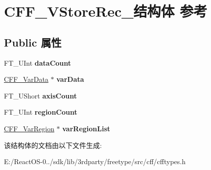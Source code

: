 \hypertarget{struct_c_f_f___v_store_rec__}{}\section{C\+F\+F\+\_\+\+V\+Store\+Rec\+\_\+结构体 参考}
\label{struct_c_f_f___v_store_rec__}
\subsection*{Public 属性}
\begin{DoxyCompactItemize}
\item 
\mbox{\label{struct_c_f_f___v_store_rec___a2d09d3df3ea4d96975e38cfc870225cf}} 
F\+T\+\_\+\+U\+Int {\bfseries data\+Count}
\item 
\mbox{\label{struct_c_f_f___v_store_rec___a93a7c518b67102698070460fa7b7b9ea}} 
\hyperlink{struct_c_f_f___var_data__}{C\+F\+F\+\_\+\+Var\+Data} $\ast$ {\bfseries var\+Data}
\item 
\mbox{\label{struct_c_f_f___v_store_rec___aafe9628f5bb2a5b56a456ef50625d54b}} 
F\+T\+\_\+\+U\+Short {\bfseries axis\+Count}
\item 
\mbox{\label{struct_c_f_f___v_store_rec___ad71acf62364b7b68725e842e4a8c54a4}} 
F\+T\+\_\+\+U\+Int {\bfseries region\+Count}
\item 
\mbox{\label{struct_c_f_f___v_store_rec___a555f377917d6269ef73d878f1d5176dc}} 
\hyperlink{struct_c_f_f___var_region__}{C\+F\+F\+\_\+\+Var\+Region} $\ast$ {\bfseries var\+Region\+List}
\end{DoxyCompactItemize}


该结构体的文档由以下文件生成\+:\begin{DoxyCompactItemize}
\item 
E\+:/\+React\+O\+S-\/0../sdk/lib/3rdparty/freetype/src/cff/cfftypes.\+h\end{DoxyCompactItemize}
